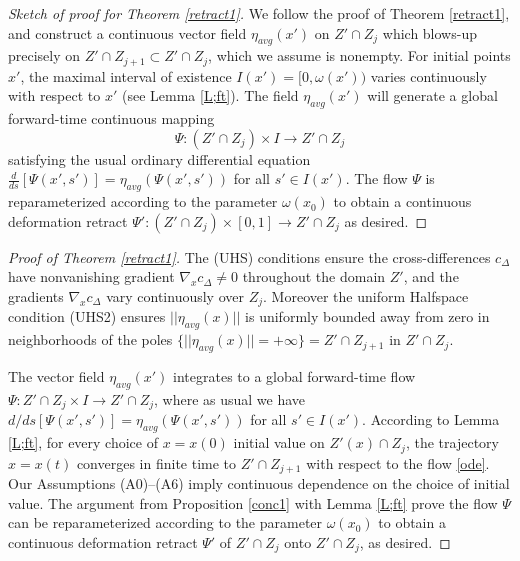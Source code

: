 \documentclass[12pt]{amsart}
\theoremstyle{definition}
\theoremstyle{remark}
\newcommand{\cd}{c_\Delta}
\begin{document}
 
\begin{proof}[Sketch of proof for Theorem \ref{retract1}] 

We follow the proof of Theorem \ref{retract1}, and construct a continuous vector field $\eta_{avg}(x')$ on $Z' \cap Z_j$ which blows-up precisely on $Z'\cap Z_{j+1} \subset Z' \cap Z_j$, which we assume is nonempty. For initial points $x'$, the maximal interval of existence $I(x')=[0, \omega(x'))$ varies continuously with respect to $x'$ (see Lemma \ref{L;ft}). The field $\eta_{avg}(x')$ will generate a global forward-time continuous mapping $$\Psi:(Z' \cap Z_j) \times I \to Z' \cap Z_j$$ satisfying the usual ordinary differential equation $\frac{d}{ds}[\Psi(x',s')]= \eta_{avg}(\Psi(x',s'))$ for all $s'\in I(x')$. The flow $\Psi$ is reparameterized according to the parameter $\omega(x_0)$ to obtain a continuous deformation retract $\Psi': (Z' \cap Z_j ) \times [0,1] \to Z' \cap Z_{j}$ as desired.
\end{proof}


\begin{proof}
[Proof of Theorem \ref{retract1}]
The (UHS) conditions ensure the cross-differences $\cd$ have nonvanishing gradient $\nabla_x \cd \neq 0$ throughout the domain $Z'$, and the gradients $\nabla_x \cd$ vary continuously over $Z_j$. Moreover the uniform Halfspace condition (UHS2) ensures $||\eta_{avg}(x)||$ is uniformly bounded away from zero in neighborhoods of the poles $\{||\eta_{avg}(x)||=+\infty\}=Z' \cap Z_{j+1}$ in $Z' \cap Z_j$. 


 
The vector field $\eta_{avg}(x')$ integrates to a global forward-time flow $\Psi: Z' \cap Z_j \times I \to Z' \cap Z_j$, where as usual we have $d/ds[\Psi(x',s')]=\eta_{avg}(\Psi(x',s'))$ for all $s'\in I(x')$. According to Lemma \ref{L;ft}, for every choice of $x=x(0)$ initial value on $Z'(x)\cap Z_j$, the trajectory $x=x(t)$ converges in finite time to $Z' \cap Z_{j+1}$ with respect to the flow \eqref{ode}. Our Assumptions (A0)--(A6) imply continuous dependence on the choice of initial value. The argument from Proposition \ref{conc1} with Lemma \ref{L;ft} prove the flow $\Psi$ can be reparameterized according to the parameter $\omega(x_0)$ to obtain a continuous deformation retract $\Psi'$ of $Z'\cap Z_j $ onto $Z' \cap Z_j$, as desired.

\end{proof}
\end{document}
